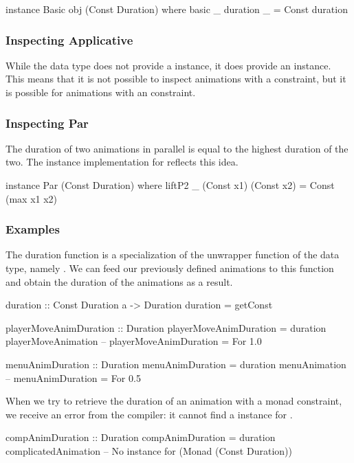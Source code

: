 \begin{code}
instance Basic obj (Const Duration) where
  basic _ duration _ = Const duration
\end{code}

\subsubsection{Inspecting Applicative}

While the  data type does not provide a  instance, it does provide an  instance. This means that it is not possible to inspect animations with a  constraint, but it is possible for animations with an  constraint.

\subsubsection{Inspecting Par}

The duration of two animations in parallel is equal to the highest duration of the two. The  instance implementation for  reflects this idea. 

\begin{code}
instance Par (Const Duration) where
  liftP2 _ (Const x1) (Const x2) = Const (max x1 x2)
\end{code}

\subsubsection{Examples}

The duration function is a specialization of the unwrapper function of the  data type, namely . We can feed our previously defined animations to this function and obtain the duration of the animations as a result.

\begin{code}
duration :: Const Duration a -> Duration
duration = getConst

playerMoveAnimDuration :: Duration
playerMoveAnimDuration = duration playerMoveAnimation
-- playerMoveAnimDuration = For 1.0

menuAnimDuration :: Duration
menuAnimDuration = duration menuAnimation
-- menuAnimDuration = For 0.5
\end{code}

When we try to retrieve the duration of an animation with a monad constraint, we receive an error from the compiler: it cannot find a  instance for .

\begin{spec}
compAnimDuration :: Duration
compAnimDuration = duration complicatedAnimation
-- No instance for (Monad (Const Duration))
\end{spec}

